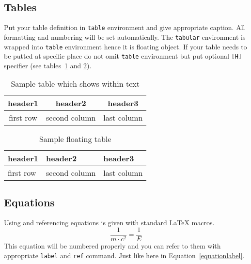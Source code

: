 \documentclass{rgg}
\begin{document}
  \subsection{Tables}
    Put your table definition in 
    \texttt{table} environment and give appropriate caption.
    All formatting and numbering will be set automatically.
    The \texttt{tabular} environment is wrapped into 
    \texttt{table} environment hence it is floating object.
    If your table needs to be putted at specific place
    do not omit \texttt{table} environment but put
    optional \texttt{[H]} specifier
    (see tables~\ref{labelforheretable} and \ref{labelforgloatingtable}).

    \begin{table}[H]
      \caption{Sample table which shows within text}
      \label{labelforheretable}
      \begin{tabular}{ccc}
        \toprule
        header1     & header2       & header3     \\
        \midrule
        first row   & second column & last column \\
        \bottomrule
      \end{tabular}
    \end{table}

    \begin{table}[b]
      \caption{Sample floating table}
      \label{labelforgloatingtable}
      \begin{tabular}{@{}lll@{}}
        \toprule
        header1 & header2 & header3 \\
        \midrule
        first row  & second column & last column \\
        \bottomrule
      \end{tabular}
    \end{table}

  \subsection{Equations}
    Using and referencing equations 
    is given with standard \LaTeX{} macros.
    \begin{equation}
      \frac{1}{m\cdot c^2} = \frac{1}{E}
      \label{equationlabel}
    \end{equation}
    This equation will be numbered properly and you
    can refer to them with appropriate
    \texttt{label} and \texttt{ref} command.
    Just like here in Equation~\ref{equationlabel}.
\end{document}
